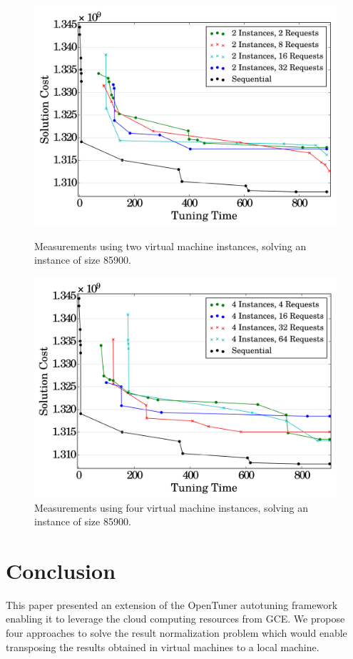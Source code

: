 \documentclass[a4paper, 12pt]{article}
\begin{document}
\begin{figure}[htpb]
    \centering
    \begin{minipage}{.5\textwidth}
        \centering
        \includegraphics[scale=.36]{i2_p_n_comparison_85900}
        \caption{Measurements using two virtual machine instances,
                 solving an instance of size 85900.}
        \label{fig:high-level}
    \end{minipage}%
    \hfill
    \begin{minipage}{.5\textwidth}
        \centering
        \includegraphics[scale=.36]{i4_p_n_comparison_85900}
        \caption{Measurements using four virtual machine instances,
                 solving an instance of size 85900.}
        \label{fig:low-level}
    \end{minipage}%
    \label{fig:archs}
\end{figure}

\section{Conclusion} \label{sec:conclusion}

This paper presented an extension of the OpenTuner autotuning framework
enabling it to leverage the cloud computing resources from GCE.  We propose
four approaches to solve the result normalization problem which would enable
transposing the results obtained in virtual machines to a local machine.



\end{document}
